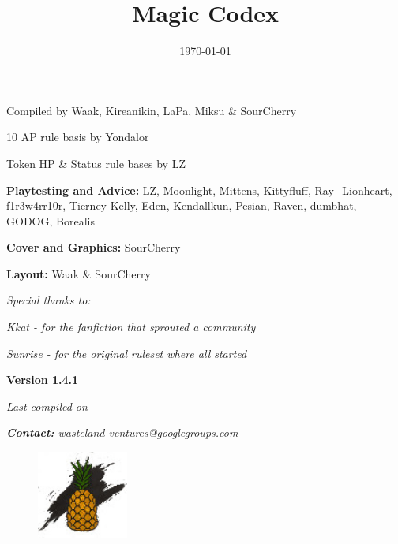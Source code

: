 \documentclass[11pt,a4paper,twocolumn]{book}
\title{Magic Codex}
\date{\today}
\begin{document}
	
			
	\onecolumn
	\setcounter{page}{1}	
	\begin{center}
		Compiled by Waak, Kireanikin, LaPa, Miksu \& SourCherry
		
		10 AP rule basis by Yondalor
		
		Token HP \& Status rule bases by LZ
		
		\bigskip		
		\textbf{Playtesting and Advice:} LZ, Moonlight, Mittens, Kittyfluff, Ray\_Lionheart, f1r3w4rr10r, Tierney Kelly, Eden, Kendallkun, Pesian, Raven, dumbhat, GODOG, Borealis
		
		\bigskip
		\textbf{Cover and Graphics:} SourCherry
		
		\bigskip
		\textbf{Layout:} Waak \& SourCherry
		
		\bigskip
		\emph{	Special thanks to:}
		
		\emph{	Kkat - for the fanfiction that sprouted a community}
			
		\emph{	Sunrise - for the original ruleset where all started}
	\end{center}
	
	\vfill
	
	\begin{center}
		\textbf{Version 1.4.1}
		
		\emph{Last compiled on \thedate}
        
        \emph{\textbf{Contact:} wasteland-ventures@googlegroups.com}
     
	\end{center}	
    \begin{figure}[bp]
		\centering
		\includegraphics[width=3cm]{ART/ISA_Logo}
	\end{figure}

	\twocolumn
	\tableofcontents

%
\end{document}
